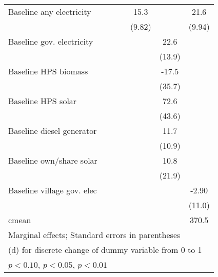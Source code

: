 \begin{table}[htbp]
\begin{tabular*}{1\hsize}{@{\hskip\tabcolsep\extracolsep\fill}l*{6}{c}}
Baseline any electricity&                  &                  &                  &     15.3         &                  &     21.6\sym{**} \\
                &                  &                  &                  &   (9.82)         &                  &   (9.94)         \\
Baseline gov. electricity&                  &                  &                  &                  &     22.6         &                  \\
                &                  &                  &                  &                  &   (13.9)         &                  \\
Baseline HPS biomass&                  &                  &                  &                  &    -17.5         &                  \\
                &                  &                  &                  &                  &   (35.7)         &                  \\
Baseline HPS solar&                  &                  &                  &                  &     72.6\sym{*}  &                  \\
                &                  &                  &                  &                  &   (43.6)         &                  \\
Baseline diesel generator&                  &                  &                  &                  &     11.7         &                  \\
                &                  &                  &                  &                  &   (10.9)         &                  \\
Baseline own/share solar&                  &                  &                  &                  &     10.8         &                  \\
                &                  &                  &                  &                  &   (21.9)         &                  \\
Baseline village gov. elec&                  &                  &                  &                  &                  &    -2.90         \\
                &                  &                  &                  &                  &                  &   (11.0)         \\
\midrule
cmean           &                  &                  &                  &                  &                  &    370.5         \\
\bottomrule
\multicolumn{7}{l}{\footnotesize Marginal effects; Standard errors in parentheses}\\
\multicolumn{7}{l}{\footnotesize  (d) for discrete change of dummy variable from 0 to 1}\\
\multicolumn{7}{l}{\footnotesize \sym{*} \(p<0.10\), \sym{**} \(p<0.05\), \sym{***} \(p<0.01\)}\\
\end{tabular*}
\end{table}
